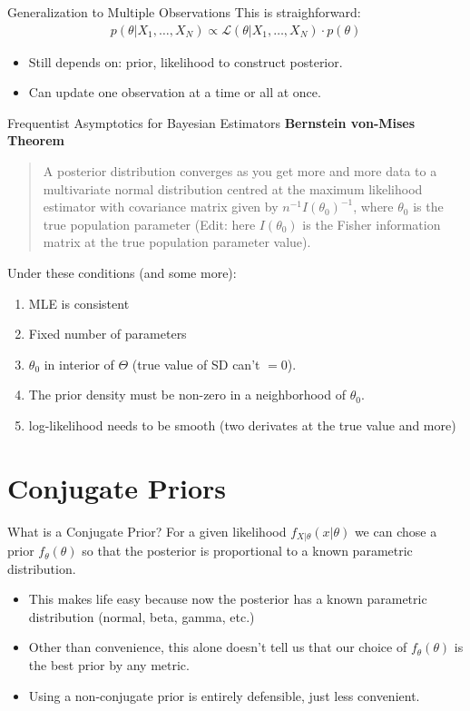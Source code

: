 \documentclass[aspectratio=169]{beamer}
\begin{document}
\begin{frame}{Generalization to Multiple Observations}
This is straighforward:
\begin{align*}
p(\theta | X_{1}, \ldots, X_{N}) \propto \mathcal{L}(\theta | X_{1}, \ldots, X_{N}) \cdot p(\theta)
\end{align*}
\begin{itemize}
\item Still depends on: \alert{prior}, \alert{likelihood} to construct \alert{posterior}.
\item Can update one observation at a time or all at once.
\end{itemize}
\end{frame}

\begin{frame}{Frequentist Asymptotics for Bayesian Estimators}
\textbf{Bernstein von-Mises Theorem}
\begin{quote}
A posterior distribution converges as you get more and more data to a multivariate normal distribution centred at the maximum likelihood estimator with covariance matrix given by $n^{-1} I(\theta_0)^{-1}$, where $\theta_0$ is the true population parameter (Edit: here $I(\theta_0)$ is the Fisher information matrix at the true population parameter value).
\end{quote}
Under these conditions (and some more):
\begin{enumerate}
\item MLE is consistent
\item Fixed number of parameters
\item $\theta_0$ in interior of $\Theta$ (true value of SD can't $=0$).
\item The prior density must be non-zero in a neighborhood of $\theta_0$.
\item  log-likelihood needs to be smooth (two derivates at the true value and more)
\end{enumerate}
\end{frame}

\section{Conjugate Priors}
\begin{frame}{What is a Conjugate Prior?}
For a given \alert{likelihood} $f_{X|\theta}(x| \theta)$ we can chose a \alert{prior} $f_{\theta}(\theta)$ so that the \alert{posterior} is proportional to a known parametric distribution.
\begin{itemize}
\item This makes life easy because now the posterior has a known parametric distribution (normal, beta, gamma, etc.)
\item Other than convenience, this alone doesn't tell us that our choice of $f_{\theta}(\theta)$ is the \alert{best} prior by any metric.
\item Using a non-conjugate prior is entirely defensible, just less convenient.
\end{itemize}
\end{frame}
\end{document}
